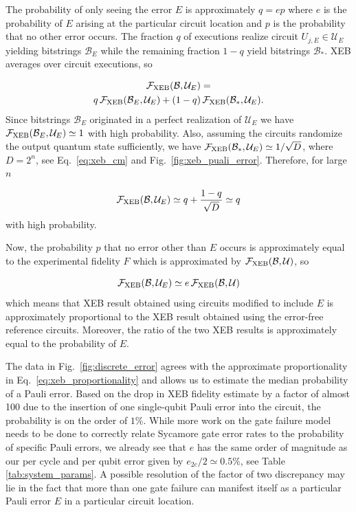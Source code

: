 The probability of only seeing the error $E$ is approximately $q = e p$ where $e$ is the probability of $E$ arising at the particular circuit location and $p$ is the probability that no other error occurs. The fraction $q$ of executions realize circuit $U_{j,E} \in \mathcal{U}_E$ yielding bitstrings $\mathcal{B}_E$ while the remaining fraction $1 - q$ yield bitstrings $\mathcal{B}_*$. XEB averages over circuit executions, so

\begin{multline}
\mathcal{F}_{\text{XEB}}(\mathcal{B}, \mathcal{U}_E) = \\ q \, \mathcal{F}_{\text{XEB}}(\mathcal{B}_E, \mathcal{U}_E) + (1 - q) \, \mathcal{F}_{\text{XEB}}(\mathcal{B}_*, \mathcal{U}_E).
\end{multline}
Since bitstrings $\mathcal{B}_E$ originated in a perfect realization of $\mathcal{U}_E$ we have $\mathcal{F}_{\text{XEB}}(\mathcal{B}_E, \mathcal{U}_E) \simeq 1$ with high probability. Also, assuming the circuits randomize the output quantum state sufficiently, we have $\mathcal{F}_{\text{XEB}}(\mathcal{B}_*, \mathcal{U}_E) \simeq 1/\sqrt{D}$, where $D = 2^n$, see Eq.~\eqref{eq:xeb_cm} and Fig.~\ref{fig:xeb_puali_error}. Therefore, for large $n$

\begin{equation}
\mathcal{F}_{\text{XEB}}(\mathcal{B}, \mathcal{U}_E) \simeq q + \frac{1 - q}{\sqrt{D}} \simeq q
\end{equation}
with high probability.

Now, the probability $p$ that no error other than $E$ occurs is approximately equal to the experimental fidelity $F$ which is approximated by $\mathcal{F}_{\text{XEB}}(\mathcal{B}, \mathcal{U})$, so

\begin{equation} \label{eq:xeb_proportionality}
\mathcal{F}_{\text{XEB}}(\mathcal{B}, \mathcal{U}_E) \simeq e \, \mathcal{F}_{\text{XEB}}(\mathcal{B}, \mathcal{U})
\end{equation}
which means that XEB result obtained using circuits modified to include $E$ is approximately proportional to the XEB result obtained using the error-free reference circuits. Moreover, the ratio of the two XEB results is approximately equal to the probability of $E$.

The data in Fig.~\ref{fig:discrete_error} agrees with the approximate proportionality in Eq.~\eqref{eq:xeb_proportionality} and allows us to estimate the median probability of a Pauli error. Based on the drop in XEB fidelity estimate by a factor of almost 100 due to the insertion of one single-qubit Pauli error into the circuit, the probability is on the order of $1\%$. While more work on the gate failure model needs to be done to correctly relate Sycamore gate error rates to the probability of specific Pauli errors, we already see that $e$ has the same order of magnitude as our per cycle and per qubit error given by $e_{2c}/2 \simeq 0.5\%$, see Table \ref{tab:system_params}. A possible resolution of the factor of two discrepancy may lie in the fact that more than one gate failure can manifest itself as a particular Pauli error $E$ in a particular circuit location.

